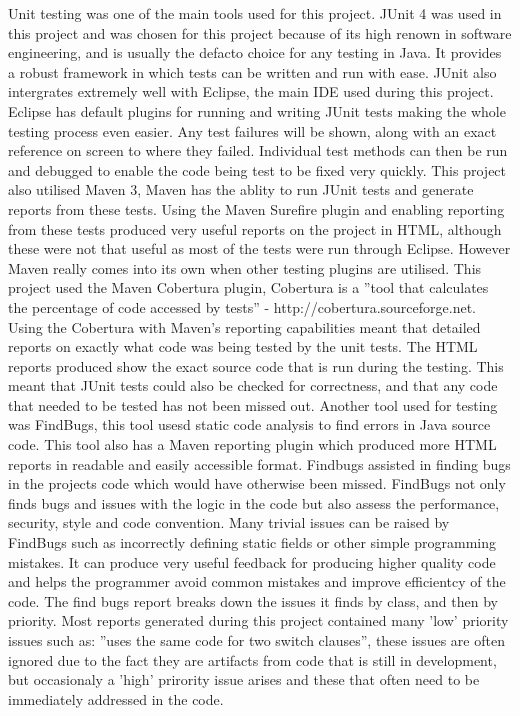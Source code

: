 \documentclass[12pt]{article}
\begin{document}
Unit testing was one of the main tools used for this project. JUnit 4 was used in this project and was chosen for this project because
of its high renown in software engineering, and is usually the defacto choice for any testing in Java. It provides a robust framework
in which tests can be written and run with ease. JUnit also intergrates extremely well with Eclipse, the main IDE used during this project. Eclipse has default plugins for running and writing JUnit tests making the whole testing process even easier. Any test
failures will be shown, along with an exact reference on screen to where they failed. Individual test methods can then be run and
debugged to enable the code being test to be fixed very quickly.
This project also utilised Maven 3, Maven has the ablity to run JUnit tests and generate reports from these tests. Using the Maven
Surefire plugin and enabling reporting from these tests produced very useful reports on the project in HTML, although these were not
that useful as most of the tests were run through Eclipse. However Maven really comes into its own when other testing plugins are
utilised. This project used the Maven Cobertura plugin, Cobertura is a ''tool that calculates the percentage of code accessed by 
tests'' - http://cobertura.sourceforge.net. Using the Cobertura with Maven's reporting capabilities meant that detailed reports
on exactly what code was being tested by the unit tests. The HTML reports produced show the exact source code that is run during the
testing. This meant that JUnit tests could also be checked for correctness, and that any code that needed to be tested has not been
missed out.
Another tool used for testing was FindBugs, this tool usesd static code analysis to find errors in Java source code. This tool also
has a Maven reporting plugin which produced more HTML reports in readable and easily accessible format. Findbugs assisted in finding bugs in the projects code which would have otherwise been missed. FindBugs not only finds bugs and issues with the logic in the code
but also assess the performance, security, style and code convention. Many trivial issues can be raised by FindBugs such as 
incorrectly defining static fields or other simple programming mistakes. It can produce very useful feedback for producing
higher quality code and helps the programmer avoid common mistakes and improve efficientcy of the code. The find bugs report breaks
down the issues it finds by class, and then by priority. Most reports generated during this project contained many 'low' priority
issues such as: ''uses the same code for two switch clauses'', these issues are often ignored due to the fact they are artifacts
from code that is still in development, but occasionaly a 'high' prirority issue arises and these that often need to be immediately
addressed in the code. 
\end{document}
